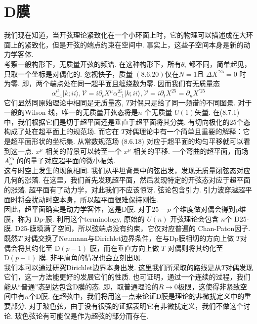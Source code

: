 \section{D膜}%
我们现在知道，当开弦理论紧致化在一个小环面上时，它的物理可以描述成在大环面上的紧致化，但是开弦的端点约束在空间中. 事实上，这些子空间本身是新的动力学客体.\\
考察一般构形下，无质量开弦的频谱. 在这种构形下，所有$\theta_{i}$ 都不同，简单起见，只取一个坐标是对偶化的. 忽视快子，质量 $(8.6 .20)$仅在$N=1$且 $\Delta X^{\prime 25}=0 $ 时为零. 即，两个端点处在同一超平面且缠绕数为零. 因而我们有无质量态
\begin{subequations}
\begin{equation}
		\alpha_{-1}^{\mu}|k ; i i\rangle,  \mathscr{V}=i \partial_{t} X^{\mu} 
\end{equation}
\begin{equation}
\alpha_{-1}^{25}|k ; i i\rangle,  \mathscr{V}=i \partial_{t} X^{25}=\partial_{n} X^{\prime 25}
\end{equation}
\end{subequations}
它们显然同原始理论中相同是无质量态, $T$对偶只是给了同一频谱的不同图景. 对于一般的Wilson 线，唯一的无质量开弦态将是$n$ 个无质量 $U(1)$矢量. 在(8.7.1)中，我们根据它们是切于超平面还是垂直于超平面将其分类. 有切向极化的25个态构成了处在超平面上的规范场. 而它在 $T$对偶理论中有一个简单且重要的解释：它是超平面形状的坐标集. 从常数规范场 (8.6.18) 对应于超平面的均匀平移就可以看到这一点. $x^{\mu}$ 相关的背景可以转至一个 $x^{\mu}$ 相关的平移. 一个弯曲的超平面，而场 $A_{i i}^{25}$ 的的量子对应超平面的微小振荡.\\
这与时空上发生的现象相同. 我们从平坦背景中的弦出发，发现无质量闭弦态对应几何的涨落. 在这里，我们首先发现超平面，然后发现特定的开弦态对应于超平面的涨落. 超平面有了动力学，对此我们不应该惊讶. 弦论包含引力. 引力波穿越超平面时将会扰动时空本身，所以超平面很难保持刚性.\\
因此，超平面确实是动力学客体，这是D膜. 对于$25-p$ 个维度做对偶会得到p维膜，称为 Dp-膜. 利用这个terminology, 原始的 $U(n)$ 开弦理论会包含 $n$个 D25-膜. D25-膜填满了空间，所以弦端点没有约束，它仅对应普遍的 Chan-Paton因子.\\
既然$T$ 对偶交换了Neumann与Dirichlet边界条件，在与Dp膜相切的方向上做 $T$对偶会将其约化至 $\mathrm{D}(p-1)$ 膜，而在垂直方向上做 $T$ 对偶则将其约化至$\mathrm{D}(p+1)$ 膜. 非平庸角的情况也会立刻出现. \\
我们本可以通过研究Dirichlet边界本身出发. 这里我们所采取的路线是从$T$对偶发现它们，这一方法能更好的发展它们的性质. 也可证明，通过一个连续的过程，我们能从“普通”态到达包含D膜的态. 即，取普通理论的$R \rightarrow 0$极限，这使得非紧致空间中有$n$个D膜. 在超弦中，我们将用这一点来论证D膜是理论的非微扰定义中的重要部分. 对于玻色弦，由于没有很强的证据表明它有非微扰定义，我们不做这个讨论. 玻色弦论有可能仅是作为超弦的部分而存在.\\
